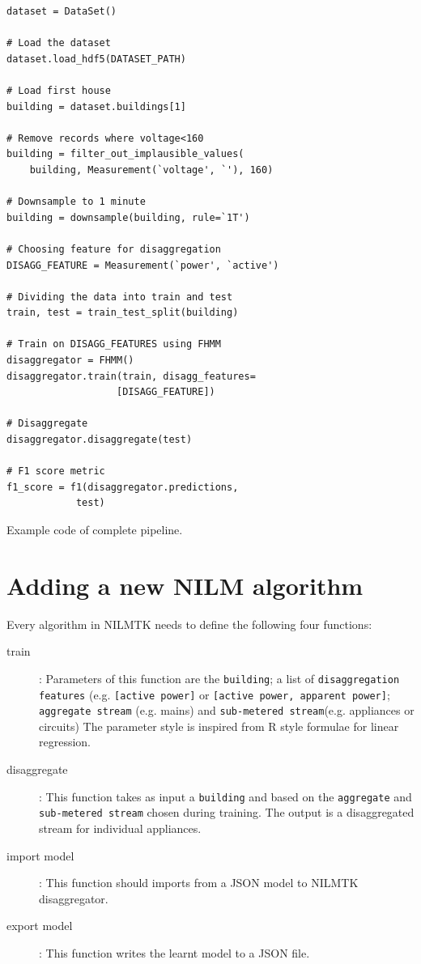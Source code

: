 \documentclass{sig-alternate}
\begin{document}
\begin{algorithm}[t]
\begin{verbatim}
dataset = DataSet() 

# Load the dataset
dataset.load_hdf5(DATASET_PATH)

# Load first house
building = dataset.buildings[1]

# Remove records where voltage<160
building = filter_out_implausible_values(
    building, Measurement(`voltage', `'), 160)
    
# Downsample to 1 minute
building = downsample(building, rule=`1T') 

# Choosing feature for disaggregation
DISAGG_FEATURE = Measurement(`power', `active')

# Dividing the data into train and test
train, test = train_test_split(building)

# Train on DISAGG_FEATURES using FHMM 
disaggregator = FHMM() 
disaggregator.train(train, disagg_features=
                   [DISAGG_FEATURE]) 
            
# Disaggregate
disaggregator.disaggregate(test)

# F1 score metric
f1_score = f1(disaggregator.predictions, 
            test) 
\end{verbatim}
 \caption{Example code of complete pipeline.}
 \label{alg:}
\end{algorithm}

\section{Adding a new NILM algorithm}
\label{app:new_algo}
\noindent Every algorithm in NILMTK needs to define the following four functions:
\begin{description}
\item[train]: Parameters of this function are the \texttt{building}; a list of \texttt{disaggregation features} (e.g. \texttt{[active power]} or \texttt{[active power, apparent power]}; 
\texttt{aggregate stream} (e.g. mains) and \texttt{sub-metered stream}(e.g. appliances or circuits)
The parameter style is inspired from R style formulae for linear regression. 
\item[disaggregate]: This function takes as input a \texttt{building} and based on the \texttt{aggregate} and \texttt{sub-metered stream} chosen during training. The output is a disaggregated stream for individual appliances.
\item[import model]: This function should imports from a JSON model to NILMTK disaggregator.
\item[export model]: This function writes the learnt model to a JSON file.
\end{description}
\end{document}

